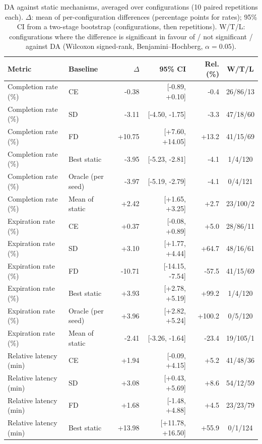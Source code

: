 \begin{table}[t]
\centering
\caption{DA against static mechanisms, averaged over configurations (10 paired repetitions each). $\Delta$: mean of per-configuration differences (percentage points for rates); 95\% CI from a two-stage bootstrap (configurations, then repetitions). W/T/L: configurations where the difference is significant in favour of / not significant / against DA (Wilcoxon signed-rank, Benjamini--Hochberg, $\alpha=0.05$).}
\label{tab:stats-headline}
\small
\begin{tabular}{llrrrc}
\toprule
Metric & Baseline & $\Delta$ & 95\% CI & Rel. (\%) & W/T/L \\
\midrule
Completion rate (\%) & CE & -0.38 & [-0.89, +0.10] & -0.4 & 26/86/13 \\
Completion rate (\%) & SD & -3.11 & [-4.50, -1.75] & -3.3 & 47/18/60 \\
Completion rate (\%) & FD & +10.75 & [+7.60, +14.05] & +13.2 & 41/15/69 \\
Completion rate (\%) & Best static & -3.95 & [-5.23, -2.81] & -4.1 & 1/4/120 \\
Completion rate (\%) & Oracle (per seed) & -3.97 & [-5.19, -2.79] & -4.1 & 0/4/121 \\
Completion rate (\%) & Mean of static & +2.42 & [+1.65, +3.25] & +2.7 & 23/100/2 \\
\midrule
Expiration rate (\%) & CE & +0.37 & [-0.08, +0.89] & +5.0 & 28/86/11 \\
Expiration rate (\%) & SD & +3.10 & [+1.77, +4.44] & +64.7 & 48/16/61 \\
Expiration rate (\%) & FD & -10.71 & [-14.15, -7.54] & -57.5 & 41/15/69 \\
Expiration rate (\%) & Best static & +3.93 & [+2.78, +5.19] & +99.2 & 1/4/120 \\
Expiration rate (\%) & Oracle (per seed) & +3.96 & [+2.82, +5.24] & +100.2 & 0/5/120 \\
Expiration rate (\%) & Mean of static & -2.41 & [-3.26, -1.64] & -23.4 & 19/105/1 \\
\midrule
Relative latency (min) & CE & +1.94 & [-0.09, +4.15] & +5.2 & 41/48/36 \\
Relative latency (min) & SD & +3.08 & [+0.43, +5.69] & +8.6 & 54/12/59 \\
Relative latency (min) & FD & +1.68 & [-1.48, +4.88] & +4.5 & 23/23/79 \\
Relative latency (min) & Best static & +13.98 & [+11.78, +16.50] & +55.9 & 0/1/124 \\

\end{tabular}
\end{table}
